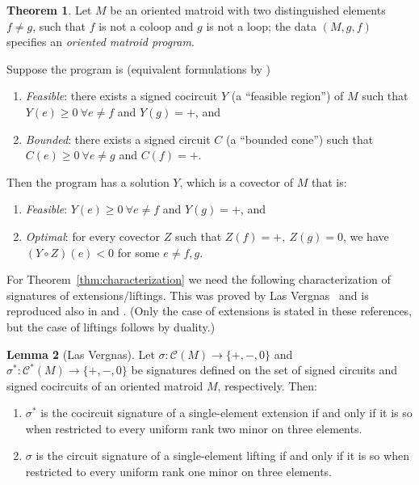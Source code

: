 \documentclass[12pt]{amsart}
\numberwithin{equation}{section}
\theoremstyle{definition}
\newtheorem{theorem}{Theorem}[section]
\newtheorem{lemma}[theorem]{Lemma}
\newcommand{\Ccal}{{\mathcal C}}
\begin{document}
\begin{theorem} \cite[Theorem 10.1.13]{BLSWZ_book} \label{thm:OMP}
Let $M$ be an oriented matroid with two distinguished elements $f\neq g$, such that $f$ is not a coloop and $g$ is not a loop; the data $(M,g,f)$ specifies an {\em oriented matroid program}.

Suppose the program is (equivalent formulations by \cite[Theorem 10.1.9]{BLSWZ_book})
\begin{enumerate}
    \item {\em Feasible}: there exists a signed cocircuit $Y$ (a ``feasible region'') of $M$ such that $Y(e)\geq 0 \  \forall e\neq f$ and $Y(g)=+$, and
    \item {\em Bounded}: there exists a signed circuit $C$ (a ``bounded cone'') such that $C(e)\geq 0\  \forall e\neq g$ and $C(f)=+$.
\end{enumerate}

Then the program has a solution $Y$, which is a covector of $M$ that is:
\begin{enumerate}
    \item {\em Feasible}: $Y(e)\geq 0 \  \forall e\neq f$ and $Y(g)=+$, and
    \item {\em Optimal}: for every covector $Z$ such that $Z(f)=+,\ Z(g)=0$, we have $(Y\circ Z)(e)<0$ for some $e\neq f,g$.
\end{enumerate}
\end{theorem}

For Theorem~\ref{thm:characterization}
we need the following characterization of signatures of extensions/liftings. This was proved by Las Vergnas~\cite{LasVergnas} and is reproduced also in \cite[Theorem 7.1.8]{BLSWZ_book} and \cite[Lemma 1.3]{Santos_book}. (Only the case of extensions is stated in these references, but the case of liftings follows by duality.)


\begin{lemma}[Las Vergnas]
\label{lemma:3elements}
Let $\sigma: \Ccal(M)\to \{+,-,0\}$ and $\sigma^*: \Ccal^*(M)\to \{+,-,0\}$ be signatures defined on the set of signed circuits and signed cocircuits of an oriented matroid $M$, respectively. Then:
\begin{enumerate}
    \item $\sigma^*$ is the cocircuit signature of a single-element extension if and only if it is so when restricted to every uniform rank two minor on three elements.
    \item $\sigma$ is the circuit signature of a single-element lifting if and only if it is so when restricted to every uniform rank one minor on three elements.
\end{enumerate}
\end{lemma}
\end{document}
